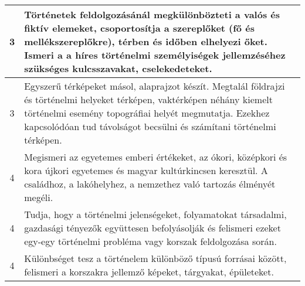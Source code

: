 \begin{longtable}{c | p{} }
                                
                                          3 &  Történetek feldolgozásánál megkülönbözteti a valós és fiktív elemeket, csoportosítja a szereplőket (fő és mellékszereplőkre), térben és időben elhelyezi őket. Ismeri a a híres történelmi személyiségek jellemzéséhez szükséges kulcsszavakat, cselekedeteket. \\ \hline
                                          3 &  Egyszerű térképeket másol, alaprajzot készít. Megtalál földrajzi és történelmi helyeket térképen, vaktérképen néhány kiemelt történelmi esemény topográfiai helyét megmutatja. Ezekhez kapcsolódóan tud távolságot becsülni és számítani történelmi térképen. \\ \hline
                                      
                                
                                          4 &  Megismeri az egyetemes emberi értékeket, az ókori, középkori és kora újkori egyetemes és magyar kultúrkincsen keresztül. A családhoz, a lakóhelyhez, a nemzethez való tartozás élményét megéli. \\ \hline
                                          4 &  Tudja, hogy a történelmi jelenségeket, folyamatokat társadalmi, gazdasági tényezők együttesen befolyásolják és felismeri ezeket egy-egy történelmi probléma vagy korszak feldolgozása során. \\ \hline
                                          4 &  Különbséget tesz a történelem különböző típusú forrásai között, felismeri a korszakra jellemző képeket, tárgyakat, épületeket. \\ \hline
                                      
                        \end{longtable}
            \clearpage

